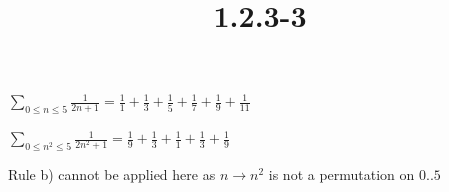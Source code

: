 \documentclass{article}
\title{1.2.3-3}
\begin{document}
\maketitle

\( \sum_{0\leq n \leq 5}\frac{1}{2n+1} = \frac{1}{1} + \frac{1}{3} + \frac{1}{5} + \frac{1}{7} + \frac{1}{9} + \frac{1}{11} \)

\( \sum_{0\leq n^2 \leq 5}\frac{1}{2n^2+1} = \frac{1}{9} + \frac{1}{3} + \frac{1}{1} + \frac{1}{3} + \frac{1}{9} \)

Rule b) cannot be applied here as \( n \to n^2 \) is not a permutation on \( 0..5 \)
\end{document}

